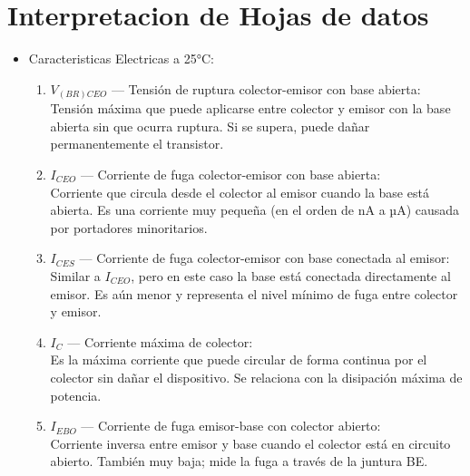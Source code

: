 \chapter{Interpretacion de Hojas de datos}

    \begin{itemize}
        
            \item Caracteristicas Electricas a 25°C:
            
                \begin{enumerate}
                    \item \textbf{$V_{(BR)CEO}$} — Tensión de ruptura colector-emisor con base abierta: \\
                    Tensión máxima que puede aplicarse entre colector y emisor con la base abierta sin que ocurra ruptura. Si se supera, puede dañar permanentemente el transistor.
                
                    \item \textbf{$I_{CEO}$} — Corriente de fuga colector-emisor con base abierta: \\
                    Corriente que circula desde el colector al emisor cuando la base está abierta. Es una corriente muy pequeña (en el orden de nA a µA) causada por portadores minoritarios.
                
                    \item \textbf{$I_{CES}$} — Corriente de fuga colector-emisor con base conectada al emisor: \\
                    Similar a $I_{CEO}$, pero en este caso la base está conectada directamente al emisor. Es aún menor y representa el nivel mínimo de fuga entre colector y emisor.
                
                    \item \textbf{$I_C$} — Corriente máxima de colector: \\
                    Es la máxima corriente que puede circular de forma continua por el colector sin dañar el dispositivo. Se relaciona con la disipación máxima de potencia.
                
                    \item \textbf{$I_{EBO}$} — Corriente de fuga emisor-base con colector abierto: \\
                    Corriente inversa entre emisor y base cuando el colector está en circuito abierto. También muy baja; mide la fuga a través de la juntura BE.      
                \end{enumerate}
                

\end{itemize}
